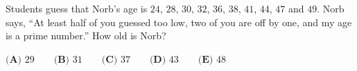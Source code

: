 Students guess that Norb's age is $24$, $28$, $30$, $32$, $36$, $38$, $41$, $44$, $47$ and $49$. Norb says, ``At least half of you guessed too low, two of you are off by one, and my age is a prime number.'' How old is Norb?

$\textbf{(A) }29\qquad\textbf{(B) }31\qquad\textbf{(C) }37\qquad\textbf{(D) }43\qquad\textbf{(E) }48$
